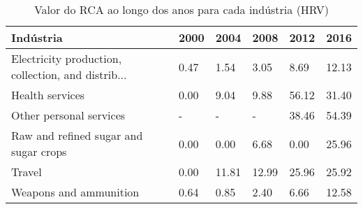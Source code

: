 \begin{table}
\centering
\caption{Valor do RCA ao longo dos anos para cada indústria (HRV)}
\begin{tabular}{p{6cm}p{1.5cm}p{1.5cm}p{1.5cm}p{1.5cm}p{1.5cm}}
\toprule
                                         Indústria & 2000 &  2004 &  2008 &  2012 &  2016 \\
\midrule
Electricity production, collection, and distrib... & 0.47 &  1.54 &  3.05 &  8.69 & 12.13 \\
                                   Health services & 0.00 &  9.04 &  9.88 & 56.12 & 31.40 \\
                           Other personal services &    - &     - &     - & 38.46 & 54.39 \\
             Raw and refined sugar and sugar crops & 0.00 &  0.00 &  6.68 &  0.00 & 25.96 \\
                                            Travel & 0.00 & 11.81 & 12.99 & 25.96 & 25.92 \\
                            Weapons and ammunition & 0.64 &  0.85 &  2.40 &  6.66 & 12.58 \\
\bottomrule
\end{tabular}
\end{table}
